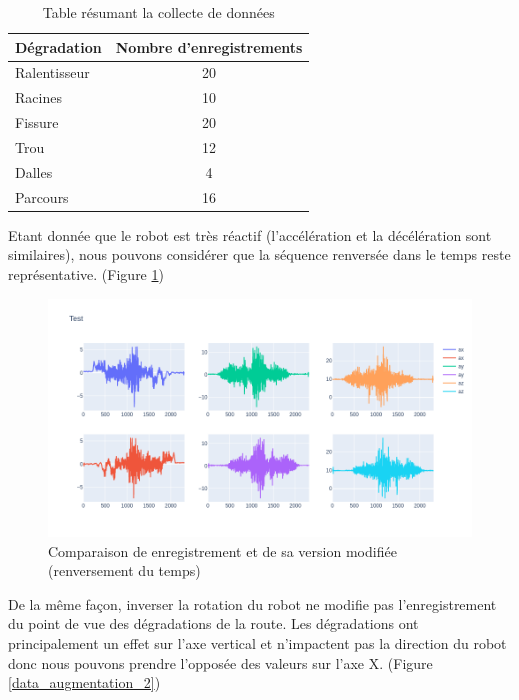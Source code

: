 \begin{table}[]
    \begin{tabular}{|l|c|}
    \hline
    Dégradation  & \multicolumn{1}{l|}{Nombre d'enregistrements} \\ \hline
    Ralentisseur & 20                                            \\ \hline
    Racines      & 10                                            \\ \hline
    Fissure      & 20                                            \\ \hline
    Trou         & 12                                            \\ \hline
    Dalles       & 4                                             \\ \hline
    Parcours     & 16                                            \\ \hline
    \end{tabular}
    \caption{Table résumant la collecte de données}
    \label{data_collection_table}
\end{table}

Etant donnée que le robot est très réactif (l'accélération et la décélération sont similaires), nous pouvons considérer que la séquence renversée dans le temps reste représentative. (Figure \ref{data_augmentation_1})

\begin{figure}
    \center
    \includegraphics[scale=0.5]{img/reversed_data.png}
    \caption{Comparaison de enregistrement et de sa version modifiée (renversement du temps)}
    \label{data_augmentation_1}
\end{figure}

De la même façon, inverser la rotation du robot ne modifie pas l'enregistrement du point de vue des dégradations de la route. Les dégradations ont principalement un effet sur l'axe vertical et n'impactent pas la direction du robot donc nous pouvons prendre l'opposée des valeurs sur l'axe X. (Figure \ref{data_augmentation_2})

